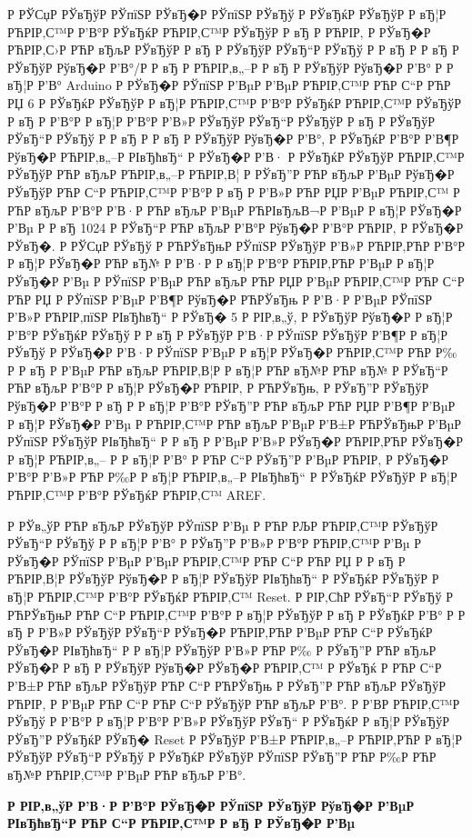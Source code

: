 \documentclass[a4paper,14pt]{extarticle}
\begin{document}
Р  РЎСџР  РЎвЂўР  РЎпїЅР  РЎвЂ�Р  РЎпїЅР  РЎвЂў Р  РЎвЂќР  РЎвЂўР  Р вЂ¦Р РЋРІР‚С™Р  Р’В°Р  РЎвЂќР РЋРІР‚С™Р  РЎвЂўР  Р вЂ  Р РЋРІР‚ Р  РЎвЂ�Р РЋРІР‚С›Р РЋР вЂљР  РЎвЂўР  Р вЂ Р  РЎвЂўР  РЎвЂ“Р  РЎвЂў Р  Р вЂ Р  Р вЂ Р  РЎвЂўР  РўвЂ�Р  Р’В°/Р  Р вЂ Р РЋРІР‚в„–Р  Р вЂ Р  РЎвЂўР  РўвЂ�Р  Р’В° Р  Р вЂ¦Р  Р’В° Arduino Р  РЎвЂ�Р  РЎпїЅР  Р’ВµР  Р’ВµР РЋРІР‚С™Р РЋР С“Р РЋР РЏ 6 Р  РЎвЂќР  РЎвЂўР  Р вЂ¦Р РЋРІР‚С™Р  Р’В°Р  РЎвЂќР РЋРІР‚С™Р  РЎвЂўР  Р вЂ  Р  Р’В°Р  Р вЂ¦Р  Р’В°Р  Р’В»Р  РЎвЂўР  РЎвЂ“Р  РЎвЂўР  Р вЂ Р  РЎвЂўР  РЎвЂ“Р  РЎвЂў Р  Р вЂ Р  Р вЂ Р  РЎвЂўР  РўвЂ�Р  Р’В°, Р  РЎвЂќР  Р’В°Р  Р’В¶Р  РўвЂ�Р РЋРІР‚в„–Р  РІвЂћвЂ“ Р  РЎвЂ�Р  Р’В· Р  РЎвЂќР  РЎвЂўР РЋРІР‚С™Р  РЎвЂўР РЋР вЂљР РЋРІР‚в„–Р РЋРІР‚В¦ Р  РЎвЂ”Р РЋР вЂљР  Р’ВµР  РўвЂ�Р  РЎвЂўР РЋР С“Р РЋРІР‚С™Р  Р’В°Р  Р вЂ Р  Р’В»Р РЋР РЏР  Р’ВµР РЋРІР‚С™ Р РЋР вЂљР  Р’В°Р  Р’В·Р РЋР вЂљР  Р’ВµР РЋРІвЂљВ¬Р  Р’ВµР  Р вЂ¦Р  РЎвЂ�Р  Р’Вµ Р  Р вЂ  1024 Р  РЎвЂ“Р РЋР вЂљР  Р’В°Р  РўвЂ�Р  Р’В°Р РЋРІР‚ Р  РЎвЂ�Р  РЎвЂ�. Р  РЎСџР  РЎвЂў Р РЋРЎвЂњР  РЎпїЅР  РЎвЂўР  Р’В»Р РЋРІР‚РЋР  Р’В°Р  Р вЂ¦Р  РЎвЂ�Р РЋР вЂ№ Р  Р’В·Р  Р вЂ¦Р  Р’В°Р РЋРІР‚РЋР  Р’ВµР  Р вЂ¦Р  РЎвЂ�Р  Р’Вµ Р  РЎпїЅР  Р’ВµР РЋР вЂљР РЋР РЏР  Р’ВµР РЋРІР‚С™Р РЋР С“Р РЋР РЏ Р  РЎпїЅР  Р’ВµР  Р’В¶Р  РўвЂ�Р РЋРЎвЂњ Р  Р’В·Р  Р’ВµР  РЎпїЅР  Р’В»Р РЋРІР‚пїЅР  РІвЂћвЂ“ Р  РЎвЂ� 5 Р  РІР‚в„ў, Р  РЎвЂўР  РўвЂ�Р  Р вЂ¦Р  Р’В°Р  РЎвЂќР  РЎвЂў Р  Р вЂ Р  РЎвЂўР  Р’В·Р  РЎпїЅР  РЎвЂўР  Р’В¶Р  Р вЂ¦Р  РЎвЂў Р  РЎвЂ�Р  Р’В·Р  РЎпїЅР  Р’ВµР  Р вЂ¦Р  РЎвЂ�Р РЋРІР‚С™Р РЋР Р‰ Р  Р вЂ Р  Р’ВµР РЋР вЂљР РЋРІР‚В¦Р  Р вЂ¦Р РЋР вЂ№Р РЋР вЂ№ Р  РЎвЂ“Р РЋР вЂљР  Р’В°Р  Р вЂ¦Р  РЎвЂ�Р РЋРІР‚ Р РЋРЎвЂњ, Р  РЎвЂ”Р  РЎвЂўР  РўвЂ�Р  Р’В°Р  Р вЂ  Р  Р вЂ¦Р  Р’В°Р  РЎвЂ”Р РЋР вЂљР РЋР РЏР  Р’В¶Р  Р’ВµР  Р вЂ¦Р  РЎвЂ�Р  Р’Вµ Р РЋРІР‚С™Р РЋР вЂљР  Р’ВµР  Р’В±Р РЋРЎвЂњР  Р’ВµР  РЎпїЅР  РЎвЂўР  РІвЂћвЂ“ Р  Р вЂ Р  Р’ВµР  Р’В»Р  РЎвЂ�Р РЋРІР‚РЋР  РЎвЂ�Р  Р вЂ¦Р РЋРІР‚в„– Р  Р вЂ¦Р  Р’В° Р РЋР С“Р  РЎвЂ”Р  Р’ВµР РЋРІР‚ Р  РЎвЂ�Р  Р’В°Р  Р’В»Р РЋР Р‰Р  Р вЂ¦Р РЋРІР‚в„–Р  РІвЂћвЂ“ Р  РЎвЂќР  РЎвЂўР  Р вЂ¦Р РЋРІР‚С™Р  Р’В°Р  РЎвЂќР РЋРІР‚С™ AREF.

Р  РЎв„ўР РЋР вЂљР  РЎвЂўР  РЎпїЅР  Р’Вµ Р РЋР РЉР РЋРІР‚С™Р  РЎвЂўР  РЎвЂ“Р  РЎвЂў Р  Р вЂ¦Р  Р’В° Р  РЎвЂ”Р  Р’В»Р  Р’В°Р РЋРІР‚С™Р  Р’Вµ Р  РЎвЂ�Р  РЎпїЅР  Р’ВµР  Р’ВµР РЋРІР‚С™Р РЋР С“Р РЋР РЏ Р  Р вЂ Р РЋРІР‚В¦Р  РЎвЂўР  РўвЂ�Р  Р вЂ¦Р  РЎвЂўР  РІвЂћвЂ“ Р  РЎвЂќР  РЎвЂўР  Р вЂ¦Р РЋРІР‚С™Р  Р’В°Р  РЎвЂќР РЋРІР‚С™ Reset. Р  РІР‚СћР  РЎвЂ“Р  РЎвЂў Р РЋРЎвЂњР РЋР С“Р РЋРІР‚С™Р  Р’В°Р  Р вЂ¦Р  РЎвЂўР  Р вЂ Р  РЎвЂќР  Р’В° Р  Р вЂ  Р  Р’В»Р  РЎвЂўР  РЎвЂ“Р  РЎвЂ�Р РЋРІР‚РЋР  Р’ВµР РЋР С“Р  РЎвЂќР  РЎвЂ�Р  РІвЂћвЂ“ Р  Р вЂ¦Р  РЎвЂўР  Р’В»Р РЋР Р‰ Р  РЎвЂ”Р РЋР вЂљР  РЎвЂ�Р  Р вЂ Р  РЎвЂўР  РўвЂ�Р  РЎвЂ�Р РЋРІР‚С™ Р  РЎвЂќ Р РЋР С“Р  Р’В±Р РЋР вЂљР  РЎвЂўР РЋР С“Р РЋРЎвЂњ Р  РЎвЂ”Р РЋР вЂљР  РЎвЂўР РЋРІР‚ Р  Р’ВµР РЋР С“Р РЋР С“Р  РЎвЂўР РЋР вЂљР  Р’В°. Р  Р’В­Р РЋРІР‚С™Р  РЎвЂў Р  Р’В°Р  Р вЂ¦Р  Р’В°Р  Р’В»Р  РЎвЂўР  РЎвЂ“ Р  РЎвЂќР  Р вЂ¦Р  РЎвЂўР  РЎвЂ”Р  РЎвЂќР  РЎвЂ� Reset Р  РЎвЂўР  Р’В±Р РЋРІР‚в„–Р РЋРІР‚РЋР  Р вЂ¦Р  РЎвЂўР  РЎвЂ“Р  РЎвЂў Р  РЎвЂќР  РЎвЂўР  РЎпїЅР  РЎвЂ”Р РЋР Р‰Р РЋР вЂ№Р РЋРІР‚С™Р  Р’ВµР РЋР вЂљР  Р’В°.
\centerline{\large \bfseries Р  РІР‚в„ўР  Р’В·Р  Р’В°Р  РЎвЂ�Р  РЎпїЅР  РЎвЂўР  РўвЂ�Р  Р’ВµР  РІвЂћвЂ“Р РЋР С“Р РЋРІР‚С™Р  Р вЂ Р  РЎвЂ�Р  Р’Вµ}
\end{document}
